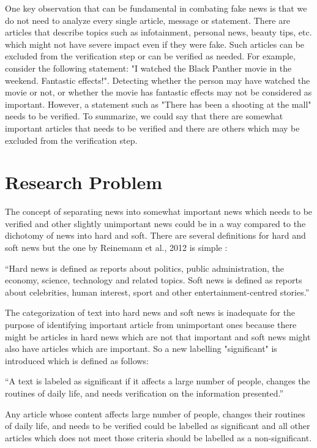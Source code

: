 One key observation that can be fundamental in combating fake news is that we do not need to analyze every single article, message or statement. There are articles that describe topics such as infotainment, personal news, beauty tips, etc. which might not have severe impact even if they were fake. Such articles can be excluded from the verification step or can be verified as needed. For example, consider the following statement: "I watched the Black Panther movie in the weekend. Fantastic effects!". Detecting whether the person may have watched the movie or not, or whether the movie has fantastic effects may not be considered as important. However, a statement such as "There has been a shooting at the mall" needs to be verified.
To summarize, we could say that there are somewhat important articles that needs to be verified and there are others which may be excluded from the verification step.

\section{Research Problem} \label{intro:research}
The concept of separating news into somewhat important news which needs to be verified and other slightly unimportant news could be in a way compared to the dichotomy of news into hard and soft. There are several definitions for hard and soft news \cite{reinemann2012hard, shoemaker2012news} but the one by Reinemann et al., 2012 is simple \cite{reinemann2012hard}: 

\enquote{Hard news is defined as reports about politics, public administration, the economy, science, technology and related topics. Soft news is defined as reports about celebrities, human interest, sport and other entertainment-centred stories.}

The categorization of text into hard news and soft news is inadequate for the purpose of identifying important article from unimportant ones because there might be articles in hard news which are not that important and soft news might also have articles which are important. So a new labelling "significant" is introduced which is defined as follows:

\enquote{A text is labeled as significant if it affects a large number of people, changes the routines of daily life, and needs verification on the information presented.}

Any article whose content affects large number of people, changes their routines of daily life, and needs to be verified could be labelled as significant and all other articles which does not meet those criteria should be labelled as a non-significant. 


